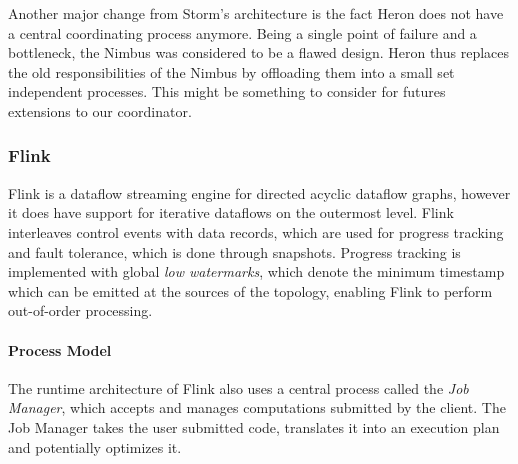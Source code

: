 Another major change from Storm's architecture
is the fact Heron does not have a central coordinating process anymore. Being
a single point of failure and a bottleneck, the Nimbus was considered to be a
flawed design. Heron thus replaces the old responsibilities of the Nimbus by
offloading them into a small set independent processes. This might be something
to consider for futures extensions to our coordinator.

\subsubsection{Flink}

Flink \cite{flink} is a dataflow streaming engine for directed acyclic
dataflow graphs, however it does have support for iterative dataflows on the
outermost level. Flink interleaves control events with data records, which
are used for progress tracking and fault tolerance, which is done through
snapshots. Progress tracking is implemented with global \emph{low watermarks}, which
denote the minimum timestamp which can be emitted at the sources of the
topology, enabling Flink to perform out-of-order processing.

\paragraph{Process Model}

The runtime architecture of Flink also uses a central process called the
\emph{Job Manager}, which accepts and manages computations submitted by
the client. The Job Manager takes the user submitted code, translates it into
an execution plan and potentially optimizes it.

